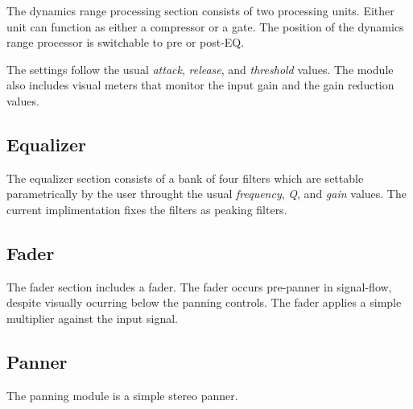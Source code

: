 \documentclass[letterpaper, 12pt, twosided, twocolumn]{article}
\begin{document}
The dynamics range processing section consists of two processing units. Either unit can function as either a compressor or a gate. The position of the dynamics range processor is switchable to pre or post-EQ.

The settings follow the usual \emph{attack}, \emph{release}, and \emph{threshold} values. The module also includes visual meters that monitor the input gain and the gain reduction values.

\subsection{Equalizer}

The equalizer section consists of a bank of four filters which are settable parametrically by the user throught the usual \emph{frequency}, \emph{Q}, and \emph{gain} values. The current implimentation fixes the filters as peaking filters.

\subsection{Fader}

The fader section includes a fader. The fader occurs pre-panner in signal-flow, despite visually ocurring below the panning controls. The fader applies a simple multiplier against the input signal.

\subsection{Panner}

The panning module is a simple stereo panner. 
\end{document}
